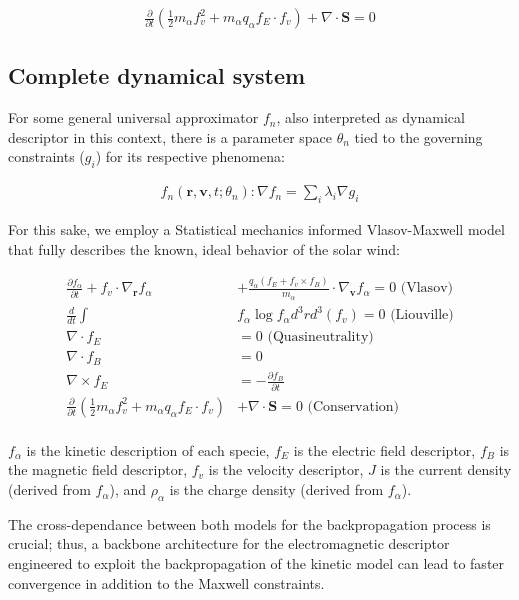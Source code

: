 \documentclass[12pt]{article}
\begin{document}
\begin{align*}
    \frac{\partial}{\partial t} \left( \frac{1}{2} m_\alpha f_v^2 + m_\alpha q_\alpha f_E \cdot f_v\right) + \nabla \cdot \textbf{S} = 0
\end{align*}


\subsection{Complete dynamical system}
For some general universal approximator $f_n$, also interpreted as dynamical descriptor in this context, there is a parameter space $\theta_n$ tied to the governing constraints ($g_i$) for its respective phenomena:

\begin{align*}
    f_n(\mathbf{r}, \mathbf{v}, t; \theta_n): \nabla f_n = \sum_{i} \lambda_i \nabla g_i
\end{align*}

For this sake, we employ a Statistical mechanics informed Vlasov-Maxwell model that fully describes the known, ideal behavior of the solar wind:

\begin{align*}
    \frac{\partial f_\alpha}{\partial t} + f_v \cdot \nabla_{\mathbf{r}} f_\alpha &+ \frac{q_\alpha ( f_E + f_v \times f_B)}{m_\alpha} \cdot \nabla_{\mathbf{v}} f_\alpha = 0 \text{ (Vlasov)}\\
\frac{d}{dt} \int &f_\alpha \log f_\alpha d^3r d^3(f_v) = 0 \text{ (Liouville)}\\
\nabla \cdot f_E &= 0 \text{ (Quasineutrality)}\\
\nabla \cdot f_B &= 0 \\
\nabla \times f_E &= - \frac{\partial f_B}{\partial t} \\
\frac{\partial}{\partial t} \left( \frac{1}{2} m_\alpha f_v^2 + m_\alpha q_\alpha f_E \cdot f_v \right) &+ \nabla \cdot \textbf{S} = 0 \text{ (Conservation)} \\
\end{align*}

$f_\alpha$ is the kinetic description of each specie, $f_E$ is the electric field descriptor, $f_B$ is the magnetic field descriptor, $f_v$ is the velocity descriptor, $J$ is the current density (derived from $f_\alpha$), and $\rho_\alpha$ is the charge density (derived from $f_\alpha$).

The cross-dependance between both models for the backpropagation process is crucial; thus, a backbone architecture for the electromagnetic descriptor engineered to exploit the backpropagation of the kinetic model can lead to faster convergence in addition to the Maxwell constraints.
\end{document}
